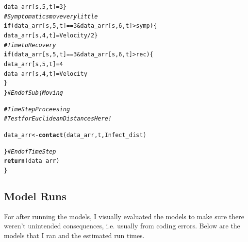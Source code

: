 \documentclass{article}\usepackage[]{graphicx}\usepackage[]{color}
\makeatletter
\newcommand{\hlnum}[1]{\textcolor[rgb]{0.686,0.059,0.569}{#1}}%
\newcommand{\hlcom}[1]{\textcolor[rgb]{0.678,0.584,0.686}{\textit{#1}}}%
\newcommand{\hlopt}[1]{\textcolor[rgb]{0,0,0}{#1}}%
\newcommand{\hlstd}[1]{\textcolor[rgb]{0.345,0.345,0.345}{#1}}%
\newcommand{\hlkwa}[1]{\textcolor[rgb]{0.161,0.373,0.58}{\textbf{#1}}}%
\newcommand{\hlkwb}[1]{\textcolor[rgb]{0.69,0.353,0.396}{#1}}%
\newcommand{\hlkwd}[1]{\textcolor[rgb]{0.737,0.353,0.396}{\textbf{#1}}}%
\newenvironment{kframe}{%
 \def\at@end@of@kframe{}%
 \ifinner\ifhmode%
  \def\at@end@of@kframe{\end{minipage}}%
  \begin{minipage}{\columnwidth}%
 \fi\fi%
 \def\FrameCommand##1{\hskip\@totalleftmargin \hskip-\fboxsep
 \colorbox{shadecolor}{##1}\hskip-\fboxsep
     \hskip-\linewidth \hskip-\@totalleftmargin \hskip\columnwidth}%
 \MakeFramed {\advance\hsize-\width
   \@totalleftmargin\z@ \linewidth\hsize
   \@setminipage}}%
 {\par\unskip\endMakeFramed%
 \at@end@of@kframe}
\newenvironment{knitrout}{}{} %
\makeatother
\begin{document}
\begin{knitrout}
\begin{kframe}
\begin{alltt}
    \hlstd{data_arr[s,}\hlnum{5}\hlstd{,t]}\hlkwb{=}\hlnum{3}\hlstd{\}}
    \hlcom{# Symptomatics move very little}
  \hlkwa{if}\hlstd{(data_arr[s,}\hlnum{5}\hlstd{,t]}\hlopt{==}\hlnum{3} \hlopt{&} \hlstd{data_arr[s,}\hlnum{6}\hlstd{,t]} \hlopt{>} \hlstd{symp)\{}
    \hlstd{data_arr[s,}\hlnum{4}\hlstd{,t]} \hlkwb{=} \hlstd{Velocity}\hlopt{/}\hlnum{2}\hlstd{\}}
  \hlcom{# Time to Recovery}
  \hlkwa{if}\hlstd{(data_arr[s,}\hlnum{5}\hlstd{,t]}\hlopt{==}\hlnum{3} \hlopt{&} \hlstd{data_arr[s,}\hlnum{6}\hlstd{,t]} \hlopt{>} \hlstd{rec)\{}
    \hlstd{data_arr[s,}\hlnum{5}\hlstd{,t]} \hlkwb{=} \hlnum{4}
    \hlstd{data_arr[s,}\hlnum{4}\hlstd{,t]} \hlkwb{=} \hlstd{Velocity}
    \hlstd{\}}
  \hlstd{\}} \hlcom{# End of Subj Moving}

  \hlcom{# Time Step Proceesing}
  \hlcom{# Test for Euclidean Distances Here!}

\hlstd{data_arr} \hlkwb{<-} \hlkwd{contact}\hlstd{(data_arr, t, Infect_dist)}

\hlstd{\}} \hlcom{# End of Time Step}
\hlkwd{return}\hlstd{(data_arr)}
\hlstd{\}}
\end{alltt}
\end{kframe}
\end{knitrout}

\subsection{Model Runs}

For after running the models, I visually evaluated the models to make sure there weren't unintended consequences, i.e. usually from coding errors. Below are the models that I ran and the estimated run times. 
\end{document}
